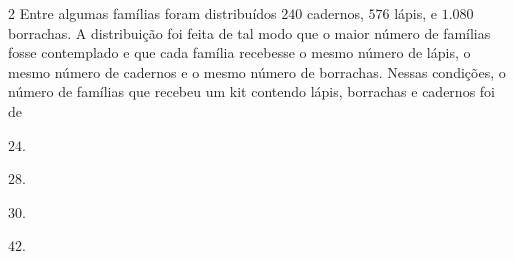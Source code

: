 

\num{2}  Entre algumas famílias foram distribuídos $240$ cadernos, $576$ lápis, e
$1.080$ borrachas. A distribuição foi feita de tal modo que o maior número
de famílias fosse contemplado e que cada família recebesse o mesmo
número de lápis, o mesmo número de cadernos e o mesmo número de
borrachas. Nessas condições, o número de famílias que recebeu um kit
contendo lápis, borrachas e cadernos foi de

\begin{escolha}
\item $24$.
\item $28$.
\item $30$.
\item $42$.
\end{escolha}



